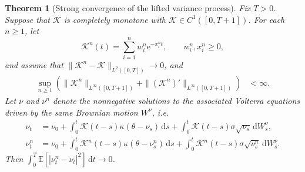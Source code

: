 \documentclass[10pt,a4paper,reqno]{amsart}
\theoremstyle{plain}
\newtheorem{theorem}{Theorem}[section]
\theoremstyle{definition}
\theoremstyle{remark}
\theoremstyle{example}
\begin{document}
\begin{theorem}[Strong convergence of the lifted variance process]
\label{thm:strong-variance-convergence-regular}
Fix $T>0$. Suppose that $\mathcal K$ is completely monotone with $\mathcal K\in C^1([0,T+1])$. For each $n\geq1$, let
\[
    \mathcal K^n(t) = \sum_{i=1}^n w_i^n \mathrm e^{-x_i^n t}, \qquad w_i^n,x_i^n\geq0,
\]
and assume that $\|\mathcal K^n-\mathcal K\|_{L^2([0,T])} \longrightarrow 0$, and
\begin{align}
    \sup_{n\geq1} \left( \|\mathcal K^n\|_{L^\infty([0,T+1])} + \|(\mathcal K^n)'\| _{L^\infty([0,T+1])} \right) &<\infty. \label{eq:regular-kernel-uniform-C1}
\end{align}
Let $\nu$ and $\nu^n$ denote the nonnegative solutions to the associated Volterra equations driven by the same Brownian motion $W^\nu$, i.e.
\begin{align}
    \nu_t &= \nu_0 + \int_0^t \mathcal K(t-s)\kappa(\theta-\nu_s)\,\mathrm ds + \int_0^t \mathcal K(t-s)\sigma\sqrt{\nu_s}\,\mathrm dW_s^\nu,
    \label{eq:regular-limit-variance}
    \\ \nu_t^n &= \nu_0 + \int_0^t \mathcal K^n(t-s)\kappa(\theta-\nu_s^n)\,\mathrm ds + \int_0^t \mathcal K^n(t-s)\sigma\sqrt{\nu_s^n}\,\mathrm dW_s^\nu. \label{eq:regular-lifted-variance}
\end{align}
Then $\int_0^T \mathbb E[ |\nu_t^n-\nu_t|^2 ]\,\mathrm dt \longrightarrow0$.
\end{theorem}
\end{document}
